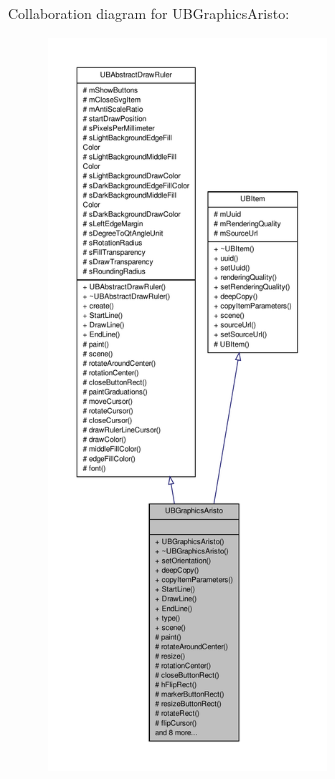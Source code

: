 Collaboration diagram for U\-B\-Graphics\-Aristo\-:
\nopagebreak
\begin{figure}[H]
\begin{center}
\leavevmode
\includegraphics[height=550pt]{d0/d54/class_u_b_graphics_aristo__coll__graph}
\end{center}
\end{figure}

